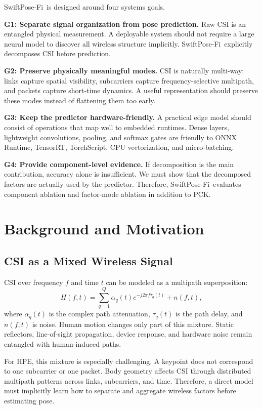 \documentclass[10pt,conference]{IEEEtran}
\newcommand{\method}{SwiftPose-Fi}
\begin{document}
\method\ is designed around four systems goals.

\textbf{G1: Separate signal organization from pose prediction.}
Raw CSI is an entangled physical measurement. A deployable system should not require a large neural model to discover all wireless structure implicitly. \method\ explicitly decomposes CSI before prediction.

\textbf{G2: Preserve physically meaningful modes.}
CSI is naturally multi-way: links capture spatial visibility, subcarriers capture frequency-selective multipath, and packets capture short-time dynamics. A useful representation should preserve these modes instead of flattening them too early.

\textbf{G3: Keep the predictor hardware-friendly.}
A practical edge model should consist of operations that map well to embedded runtimes. Dense layers, lightweight convolutions, pooling, and softmax gates are friendly to ONNX Runtime, TensorRT, TorchScript, CPU vectorization, and micro-batching.

\textbf{G4: Provide component-level evidence.}
If decomposition is the main contribution, accuracy alone is insufficient. We must show that the decomposed factors are actually used by the predictor. Therefore, \method\ evaluates component ablation and factor-mode ablation in addition to PCK.

\section{Background and Motivation}

\subsection{CSI as a Mixed Wireless Signal}

CSI over frequency $f$ and time $t$ can be modeled as a multipath superposition:
\begin{equation}
H(f,t)=\sum_{q=1}^{Q}\alpha_q(t)e^{-j2\pi f\tau_q(t)}+n(f,t),
\end{equation}
where $\alpha_q(t)$ is the complex path attenuation, $\tau_q(t)$ is the path delay, and $n(f,t)$ is noise. Human motion changes only part of this mixture. Static reflectors, line-of-sight propagation, device response, and hardware noise remain entangled with human-induced paths.

For HPE, this mixture is especially challenging. A keypoint does not correspond to one subcarrier or one packet. Body geometry affects CSI through distributed multipath patterns across links, subcarriers, and time. Therefore, a direct model must implicitly learn how to separate and aggregate wireless factors before estimating pose.
\end{document}
